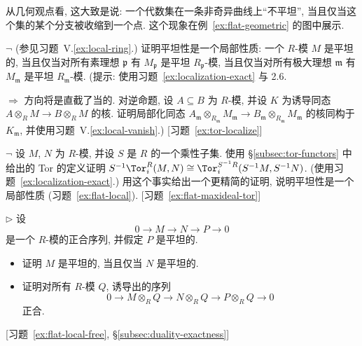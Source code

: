 从几何观点看, 这大致是说: 一个代数集在一条非奇异曲线上``不平坦'', 当且仅当这个集的某个分支被收缩到一个点. 这个现象在例~\ref{ex:flat-geometric} 的图中展示.

\begin{prob}\label{ex:flat-local}
$\neg$ (参见习题~V.\ref{ex:local-ring}.) 证明平坦性是一个局部性质: 一个 $R$-模 $M$ 是平坦的, 当且仅当对所有素理想 $\mathfrak{p}$ 有 $M_{\mathfrak{p}}$ 是平坦 $R_{\mathfrak{p}}$-模, 当且仅当对所有极大理想 $\mathfrak{m}$ 有 $M_{\mathfrak{m}}$ 是平坦 $R_{\mathfrak{m}}$-模. (提示: 使用习题~\ref{ex:localization-exact} 与 2.6.

$\Longrightarrow$ 方向将是直截了当的. 对逆命题, 设 $A\subseteq B$ 为 $R$-模, 并设 $K$ 为诱导同态 $A\otimes_R M\to B\otimes_R M$ 的核. 证明局部化同态 $A_{\mathfrak{m}}\otimes_{R_{\mathfrak{m}}}M_{\mathfrak{m}}\to B_{\mathfrak{m}}\otimes_{R_{\mathfrak{m}}}M_{\mathfrak{m}}$ 的核同构于 $K_{\mathfrak{m}}$, 并使用习题~V.\ref{ex:local-vanish}.) [习题~\ref{ex:tor-localize}]
\end{prob}

\begin{prob}\label{ex:tor-localize}
$\neg$ 设 $M$, $N$ 为 $R$-模, 并设 $S$ 是 $R$ 的一个乘性子集. 使用 §\ref{subsec:tor-functors} 中给出的 Tor 的定义证明 $S^{-1}\Tor_i^R(M,N)\cong\Tor_i^{S^{-1}R}(S^{-1}M,S^{-1}N)$. (使用习题~\ref{ex:localization-exact}.) 用这个事实给出一个更精简的证明, 说明平坦性是一个局部性质 (习题~\ref{ex:flat-local}). [习题~\ref{ex:flat-maxideal-tor}]
\end{prob}

\begin{prob}\label{ex:flat-ses}
$\triangleright$ 设
\[
0\longrightarrow M\longrightarrow N\longrightarrow P\longrightarrow 0
\]
是一个 $R$-模的正合序列, 并假定 $P$ 是平坦的.
\begin{itemize}
\item 证明 $M$ 是平坦的, 当且仅当 $N$ 是平坦的.
\item 证明对所有 $R$-模 $Q$, 诱导出的序列
\[
0\longrightarrow M\otimes_R Q\longrightarrow N\otimes_R Q\longrightarrow P\otimes_R Q\longrightarrow 0
\]
正合.
\end{itemize}
[习题~\ref{ex:flat-local-free}, §\ref{subsec:duality-exactness}]
\end{prob}

